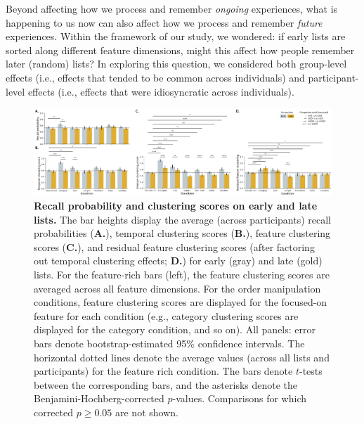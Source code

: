 \documentclass[11pt]{article}
\newcommand{\abbreviations}{S1}
\begin{document}
Beyond affecting how we process and remember \textit{ongoing} experiences, what
is happening to us now can also affect how we process and remember
\textit{future} experiences. Within the framework of our study, we wondered: if
early lists are sorted along different feature dimensions, might this affect
how people remember later (random) lists? In exploring this question, we
considered both group-level effects (i.e., effects that tended to be common
across individuals) and participant-level effects (i.e., effects that were
idiosyncratic across individuals).

\begin{figure}

    \centering
    \includegraphics[width=\textwidth]{figures/memory_perf_barchart_compare}

\caption{\textbf{Recall probability and clustering scores on early and late
lists.} The bar heights display the average (across participants) recall
probabilities (\textbf{A.}), temporal clustering scores (\textbf{B.}), feature
clustering scores (\textbf{C.}), and residual feature clustering scores (after
factoring out temporal clustering effects; \textbf{D.}) for early (gray) and
late (gold) lists. For the feature-rich bars (left), the feature clustering
scores are averaged across all feature dimensions. For the order manipulation
conditions, feature clustering scores are displayed for the focused-on feature
for each condition (e.g., category clustering scores are displayed for the
category condition, and so on). All panels: error bars denote
bootstrap-estimated 95\% confidence intervals. The horizontal dotted lines
denote the average values (across all lists and participants) for the feature
rich condition. The bars denote $t$-tests between the corresponding bars, and
the asterisks denote the Benjamini-Hochberg-corrected $p$-values. Comparisons
for which corrected $p \geq 0.05$ are not shown.} \label{fig:barplots}

\end{figure}


\begin{table}[tp]
\centering
\tiny


\caption{\textbf{Comparing accuracy on late lists in order-manipulatation
versus feature-rich conditions.} The $t$-tests reported in the table were
carried out across-participants, and reflect data aggregated across all late
lists from each participant. Abbreviations used in this table are defined in
Table~\abbreviations.}

\label{tab:accuracy-carryover}
\end{table}
\end{document}
